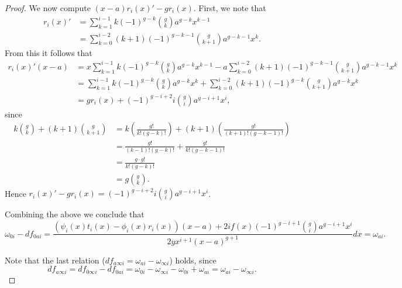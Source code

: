 \begin{proof}
    
    We now compute $(x-a)r_i(x)'-gr_i(x)$.
    First, we note that
        \begin{align*}
        r_i(x)' & = \sum_{k=1}^{i-1} k (-1)^{g-k} \binom{g}{k} a^{g-k} x^{k-1} \\
        & = \sum_{k=0}^{i-2} (k+1) (-1)^{g-k-1} \binom{g}{k+1}a^{g-k-1} x^k.
        \end{align*}
    From this it follows that
        \begin{align*}
        r_i(x)'(x-a) & = x \sum_{k=1}^{i-1} k (-1)^{g-k} \binom{g}{k} a^{g-k} x^{k-1} - a \sum_{k=0}^{i-2} (k+1) (-1)^{g-k-1} \binom{g}{k+1}a^{g-k-1} x^k \\
        & = \sum_{k=1}^{i-1} k (-1)^{g-k} \binom{g}{k} a^{g-k} x^k  + \sum_{k=0}^{i-2} (k+1) (-1)^{g-k} \binom{g}{k+1}a^{g-k} x^k \\
        & = gr_i(x) + (-1)^{g-i+2}i \binom{g}{i}a^{g-i+1}x^i,
        \end{align*}
    since
        \begin{align*}
        k\binom{g}{k} + (k+1)\binom{g}{k+1} & = k \left( \frac{g!}{k!(g-k)!} \right) + (k+1) \left( \frac{g!}{(k+1)!(g-k-1)!} \right) \\
        & = \frac{g!}{(k-1)!(g-k)!} + \frac{g!}{k!(g-k-1)!} \\
        & = \frac{g\cdot g!}{k!(g-k)!} \\
        & = g \binom{g}{k}.
        \end{align*}
    Hence $r_i(x)'-gr_i(x)= (-1)^{g-i+2}i\binom{g}{i} a^{g-i+1}x^i$. 
    
    Combining the above we conclude that
        \[
        \omega_{0 i } - df_{0a i} =  \frac{(\psi_i(x)t_i(x) - \phi_i(x)r_i(x))(x-a) + 2if(x)(-1)^{g-i+1}\binom{g}{i} a^{g-i+1}x^i}{2yx^{i+1}(x-a)^{g+1}}dx= \omega_{a i}.
        \]
    
    Note that the last relation ($df_{a \infty i} = \omega_{a i} - \omega_{\infty i}$) holds, since 
        \[
        df_{a \infty i} = df_{0 \infty i} - df_{0 a i} = \omega_{0 i} - \omega_{\infty i } - \omega_{0 i} + \omega_{a i} = \omega_{a i} - \omega_{\infty i}.
        \]
    \end{proof}

